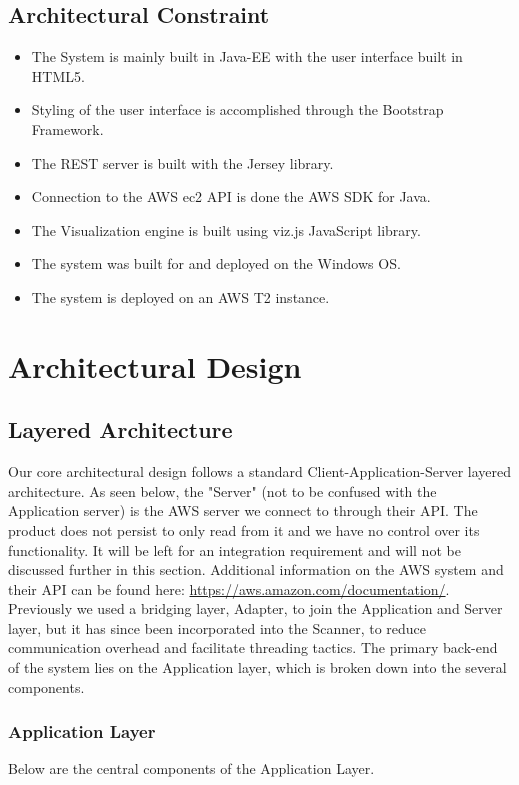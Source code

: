 \documentclass[hidelinks,a4paper,12pt]{article}
\begin{document}
\subsection{Architectural Constraint}
\begin{itemize} 
\item The System is mainly built in Java-EE with the user interface built in HTML5.
\item Styling of the user interface is accomplished through the Bootstrap Framework.
\item The REST server is built with the Jersey library.
\item Connection to the AWS ec2 API is done the AWS SDK for Java.
\item The Visualization engine is built using viz.js JavaScript library.
\item The system was built for and deployed on the Windows OS.
\item The system is deployed on an AWS T2 instance.

\end{itemize}

\section{Architectural Design}
\subsection{Layered Architecture} 

Our core architectural design follows a standard Client-Application-Server layered architecture. As seen below, the "Server" (not to be confused with the Application server) is the AWS server we connect to through their API. The product does not persist to only read from it and we have no control over its functionality. It will be left for an integration requirement and will not be discussed further in this section. Additional information on the AWS system and their API can be found here: \url{https://aws.amazon.com/documentation/}. Previously we used a bridging layer, Adapter, to join the Application and Server layer, but it has since been incorporated into the Scanner, to reduce communication overhead and facilitate threading tactics. The primary back-end of the system lies on the Application layer, which is broken down into the several components.
\subsubsection{Application Layer}
Below are the central components of the Application Layer.
\end{document}
